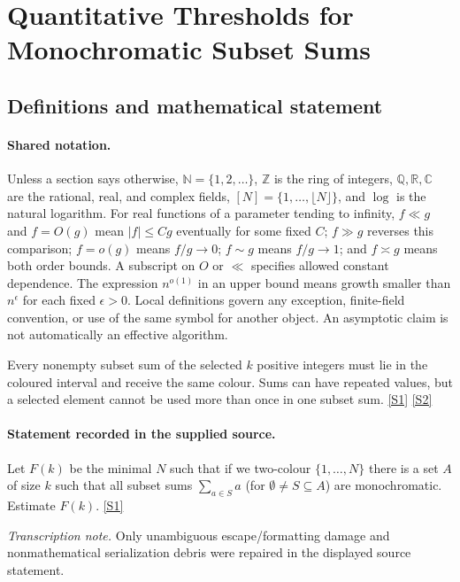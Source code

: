 \documentclass[11pt,a4paper]{article}
\newcommand{\N}{\mathbb{N}}
\newcommand{\Z}{\mathbb{Z}}
\newcommand{\Q}{\mathbb{Q}}
\newcommand{\R}{\mathbb{R}}
\newcommand{\C}{\mathbb{C}}
\newcommand{\sref}[2]{\hyperlink{source:#1:#2}{[S#2]}}
\begin{document}
\section{Quantitative Thresholds for Monochromatic Subset Sums}\label{statement}


\subsection{Definitions and mathematical statement}

\paragraph{Shared notation.}Unless a section says otherwise, $\N=\{1,2,\ldots\}$,
$\Z$ is the ring of integers, $\Q,\R,\C$ are the rational, real, and complex
fields, $[N]=\{1,\ldots,\lfloor N\rfloor\}$, and $\log$ is the natural
logarithm. For real functions of a parameter tending to infinity,
$f\ll g$ and $f=O(g)$ mean $|f|\leq Cg$ eventually for some fixed $C$;
$f\gg g$ reverses this comparison; $f=o(g)$ means $f/g\to0$;
$f\sim g$ means $f/g\to1$; and $f\asymp g$ means both order bounds.
A subscript on $O$ or $\ll$ specifies allowed constant dependence.
The expression $n^{o(1)}$ in an upper bound means growth smaller than
$n^\epsilon$ for each fixed $\epsilon>0$. Local definitions govern any
exception, finite-field convention, or use of the same symbol for another
object. An asymptotic claim is not automatically an effective algorithm.



Every nonempty subset sum of the selected $k$ positive integers must lie in the coloured interval and receive the same colour. Sums can have repeated values, but a selected element cannot be used more than once in one subset sum. \sref{statement}{1} \sref{statement}{2}

\paragraph{Statement recorded in the supplied source.}
Let $F(k)$ be the minimal $N$ such that if we two-colour $\{1,\ldots,N\}$ there is a set $A$ of size $k$ such that all subset sums $\sum_{a\in S}a$ (for $\emptyset\neq S\subseteq A$) are monochromatic. Estimate $F(k)$. \sref{statement}{1}

{\small\emph{Transcription note.} Only unambiguous escape/formatting damage and nonmathematical serialization debris were repaired in the displayed source statement.}
\end{document}
